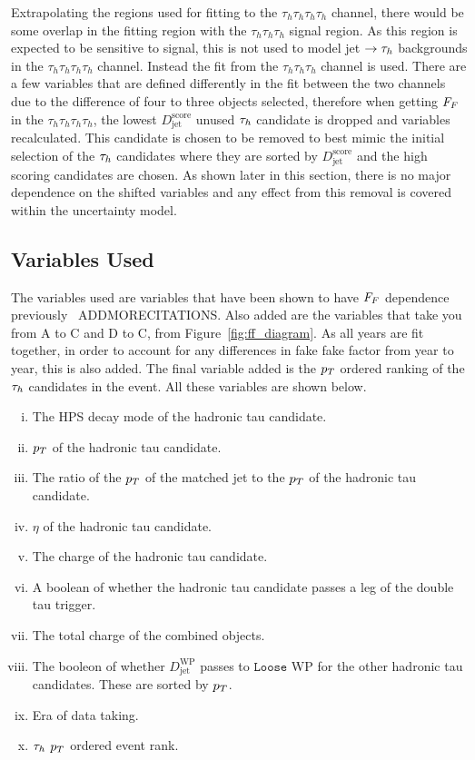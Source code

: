Extrapolating the regions used for fitting to the $\tau_h \tau_h \tau_h \tau_h$ channel, there would be some overlap in the fitting region with the $\tau_h \tau_h \tau_h$ signal region. 
As this region is expected to be sensitive to signal, this is not used to model jet $\rightarrow\tau_{h}$ backgrounds in the $\tau_h \tau_h \tau_h \tau_h$ channel. 
Instead the fit from the $\tau_h \tau_h \tau_h$ channel is used. 
There are a few variables that are defined differently in the fit between the two channels due to the difference of four to three objects selected, therefore when getting $F_{F}$ in the $\tau_h \tau_h \tau_h \tau_h$, the lowest $D_{\text{jet}}^{\text{score}}$ unused $\tau_{h}$ candidate is dropped and variables recalculated. 
This candidate is chosen to be removed to best mimic the initial selection of the $\tau_{h}$ candidates where they are sorted by $D_{\text{jet}}^{\text{score}}$ and the high scoring candidates are chosen. 
As shown later in this section, there is no major dependence on the shifted variables and any effect from this removal is covered within the uncertainty model. \\

\subsection{Variables Used}

The variables used are variables that have been shown to have $F_{F}$ dependence previously~\cite{CMS:2022rbd} ADDMORECITATIONS. 
Also added are the variables that take you from A to C and D to C, from Figure~\ref{fig:ff_diagram}. 
As all years are fit together, in order to account for any differences in fake fake factor from year to year, this is also added. 
The final variable added is the $p_{T}$ ordered ranking of the $\tau_{h}$ candidates in the event.
All these variables are shown below.

\begin{enumerate}[i)]
\item The \ac{HPS} decay mode of the hadronic tau candidate.
\item $p_{T}$ of the hadronic tau candidate.
\item The ratio of the $p_{T}$  of the matched jet to the $p_{T}$ of the hadronic tau candidate.
\item $\eta$ of the hadronic tau candidate.
\item The charge of the hadronic tau candidate.
\item A boolean of whether the hadronic tau candidate passes a leg of the double tau trigger.
\item The total charge of the combined objects.
\item The booleon of whether $D_{\text{jet}}^{\text{WP}}$ passes to $\texttt{Loose}$ WP for the other hadronic tau candidates. These are sorted by $p_{T}$.
\item Era of data taking.
\item $\tau_{h}$ $p_{T}$ ordered event rank.
\end{enumerate}

